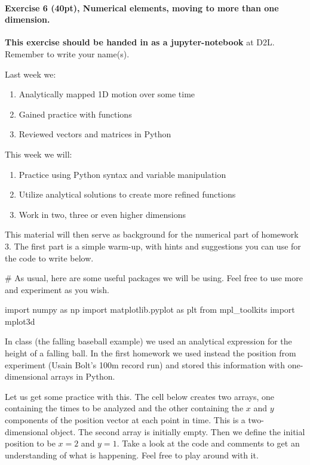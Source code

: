 \documentclass[%
oneside,                 %
final,                   %
10pt]{article}
\begin{document}
\paragraph{Exercise 6 (40pt), Numerical elements, moving to more than one dimension.}
\textbf{This exercise should be handed in as a jupyter-notebook} at D2L. Remember to write your name(s). 

Last week we:
\begin{enumerate}
\item Analytically mapped 1D motion over some time

\item Gained practice with functions

\item Reviewed vectors and matrices in Python
\end{enumerate}

\noindent
This week we will:
\begin{enumerate}
\item Practice using Python syntax and variable manipulation

\item Utilize analytical solutions to create more refined functions

\item Work in two, three or even higher dimensions
\end{enumerate}

\noindent
This material will then serve as background for the numerical part of homework 3. The first part is a simple warm-up, with hints and suggestions you can use for the code to write below. 

\bpycod
# As usual, here are some useful packages we will be using. Feel free to use more and experiment as you wish.

import numpy as np
import matplotlib.pyplot as plt
from mpl_toolkits import mplot3d
\epycod

In class (the falling baseball example) we used an  analytical expression for the height of a falling ball.
In the first homework we used instead the position from experiment (Usain Bolt's 100m record run) and stored this
information with one-dimensional arrays in Python.

Let us get some practice with this. The cell below creates two arrays,
one containing the times to be analyzed and the other containing the $x$
and $y$ components of the position vector at each point in time.  This is a two-dimensional object. The
second array is initially empty. Then we define  the initial
position to be $x=2$ and $y=1$. Take a look at the code and comments
to get an understanding of what is happening. Feel free to play around with it.
\end{document}
